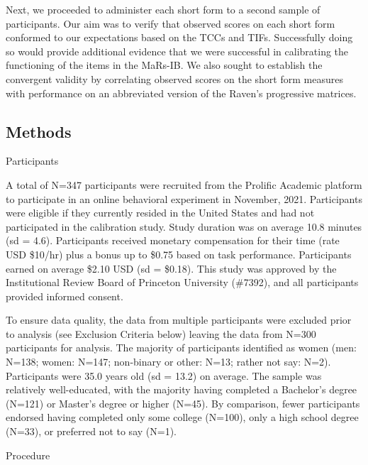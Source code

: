 \documentclass[a4paper,man,natbib]{apa6}
\makeatletter
\renewcommand{\subsubsection}{\@startsection{subsubsection}{3}
  {\z@}%
  {\b@level@two@skip}{\e@level@two@skip}%
  {\normalfont\normalsize\bfseries}}
\makeatother
\begin{document}
Next, we proceeded to administer each short form to a second sample of participants. Our aim was to verify that observed scores on each short form conformed to our expectations based on the TCCs and TIFs. Successfully doing so would provide additional evidence that we were successful in calibrating the functioning of the items in the MaRs-IB. We also sought to establish the convergent validity by correlating observed scores on the short form measures with performance on an abbreviated version of the Raven's progressive matrices.

\subsection{Methods}

\subsubsection{Participants}

A total of N=347 participants were recruited from the Prolific Academic platform to participate in an online behavioral experiment in November, 2021. Participants were eligible if they currently resided in the United States and had not participated in the calibration study. Study duration was on average 10.8 minutes (sd = 4.6). Participants received monetary compensation for their time (rate USD \$10/hr) plus a bonus up to \$0.75 based on task performance. Participants earned on average \$2.10 USD (sd = \$0.18). This study was approved by the Institutional Review Board of Princeton University (\#7392), and all participants provided informed consent. 

To ensure data quality, the data from multiple participants were excluded prior to analysis (see Exclusion Criteria below) leaving the data from N=300 participants for analysis. The majority of participants identified as women (men: N=138; women: N=147; non-binary or other: N=13; rather not say: N=2). Participants were 35.0 years old (sd = 13.2) on average. The sample was relatively well-educated, with the majority having completed a Bachelor's degree (N=121) or Master's degree or higher (N=45). By comparison, fewer participants endorsed having completed only some college (N=100), only a high school degree (N=33), or preferred not to say (N=1). 

\subsubsection{Procedure}
\end{document}
